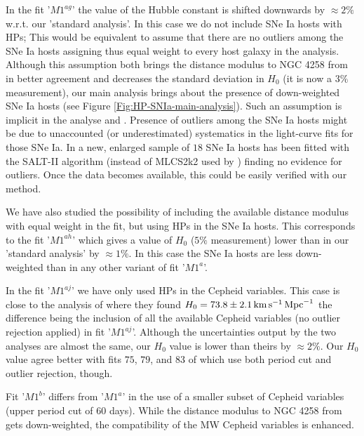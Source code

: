 In the fit '$M1^{ag}$' the value of the Hubble constant is shifted downwards by $\approx 2\%$ w.r.t. our 'standard analysis'. In this case we do not include SNe Ia hosts with HPs; This would be equivalent to assume that there are no outliers among the SNe Ia hosts assigning thus equal weight to every host galaxy in the analysis. Although this assumption both brings the distance modulus to NGC 4258 from \cite{Humphreys:2013eja} in better agreement and decreases the standard deviation in $H_0$ (it is now a $3\%$ measurement), our main analysis brings about the presence of down-weighted SNe Ia hosts (see Figure \ref{Fig:HP-SNIa-main-analysis}). Such an assumption is implicit in the analyse \cite{Riess:2011yx} and \cite{Efstathiou:2013via}. Presence of outliers among the SNe Ia hosts might be due to unaccounted (or underestimated) systematics in the light-curve fits for those SNe Ia. In \cite{Riess:2016jrr} a new, enlarged sample of $18$ SNe Ia hosts has been fitted with the SALT-II algorithm (instead of MLCS2k2 used by \cite{Riess:2011yx}) finding no evidence for outliers. Once the data becomes available, this could be easily verified with our method.

We have also studied the possibility of including the available distance modulus with equal weight in the fit, but using HPs in the SNe Ia hosts. This corresponds to the fit '$M1^{ah}$' which gives a value of $H_0$ ($5\%$ measurement) lower than in our 'standard analysis' by $\approx 1\%$. In this case the SNe Ia hosts are less down-weighted than in any other variant of fit '$M1^a$'.

In the fit '$M1^{aj}$' we have only used HPs in the Cepheid variables. This case is close to the analysis of \cite{Riess:2011yx} where they found $H_0 = 73.8 \pm 2.1 \, \mathrm{km}\, \mathrm{s}^{-1}\, \mathrm{Mpc}^{-1}$ the difference being the inclusion of all the available Cepheid variables (no outlier rejection applied) in fit '$M1^{aj}$'. Although the uncertainties output by the two analyses are almost the same, our $H_0$ value is lower than theirs by $\approx 2\%$. Our $H_0$ value agree better with fits $75$, $79$, and $83$ of \cite{Efstathiou:2013via} which use both period cut and outlier rejection, though.

Fit '$M1^b$' differs from '$M1^a$' in the use of a smaller subset of Cepheid variables (upper period cut of $60$ days). While the distance modulus to NGC 4258 from \cite{Humphreys:2013eja} gets down-weighted, the compatibility of the MW Cepheid variables is enhanced.

